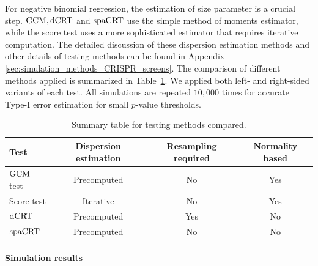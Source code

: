 \documentclass[12pt]{article}
\theoremstyle{definition}
\newcommand{\dCRT}{\textnormal{dCRT}} 					%
\newcommand{\GCM}{\textnormal{GCM}}						%
\newcommand{\spacrt}{\textnormal{spaCRT}}               %
\begin{document}
For negative binomial regression, the estimation of size parameter is a crucial step. $\GCM,\dCRT$ and $\spacrt$ use the simple method of moments estimator, while the score test uses a more sophisticated estimator that requires iterative computation. The detailed discussion of these dispersion estimation methods and other details of testing methods can be found in Appendix \ref{sec:simulation_methods_CRISPR_screens}. The comparison of different methods applied is summarized in Table~\ref{tab:methodology_summary}. We applied both left- and right-sided variants of each test. All simulations are repeated $10,000$ times for accurate Type-I error estimation for small $p$-value thresholds. 

\begin{table}[!h]
  \centering
  \begin{tabular}{l|c|c|c}
  Test & Dispersion estimation & Resampling required & Normality based \\
  \hline
  $\GCM$ test & Precomputed & No & Yes \\
  Score test & Iterative & No & Yes \\
  $\dCRT$ & Precomputed & Yes & No \\
  $\spacrt$ & Precomputed & No & No
  \end{tabular}
\caption{Summary table for testing methods compared.}
\label{tab:methodology_summary}
\end{table}

\paragraph{Simulation results}
\end{document}
